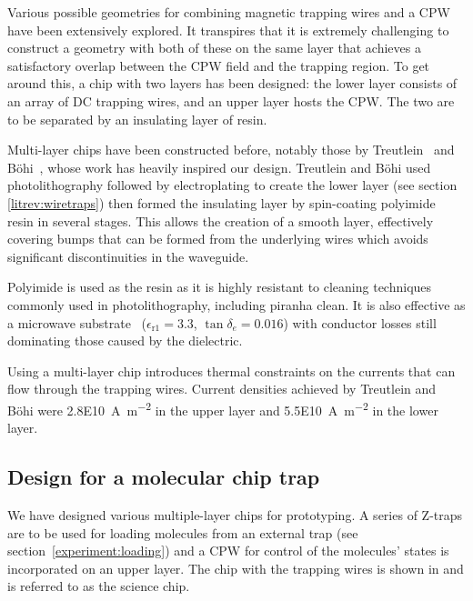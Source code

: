 Various possible geometries for combining magnetic trapping wires and a CPW have
been extensively explored. It transpires that it is extremely challenging to
construct a geometry with both of these on the same layer that achieves a
satisfactory overlap between the CPW field and the trapping region. To get
around this, a chip with two layers has been designed: the lower layer consists
of an array of DC trapping wires, and an upper layer hosts the CPW. The two are
to be separated by an insulating layer of resin.

Multi-layer chips have been constructed before, notably those by
Treutlein~\cite{Treutlein2008} and B\"ohi~\cite{rohuta}, whose work has heavily
inspired our design. Treutlein and B\"ohi used photolithography followed by
electroplating to create the lower layer (see section \ref{litrev:wiretraps})
then formed the insulating layer by spin-coating polyimide resin in several
stages. This allows the creation of a smooth layer, effectively covering bumps
that can be formed from the underlying wires which avoids significant
discontinuities in the waveguide.

Polyimide is used as the resin as it is highly resistant to cleaning techniques
commonly used in photolithography, including piranha clean.  It is also
effective as a microwave substrate~\cite{Simons2004}
($\epsilon_\mathrm{r1} = 3.3$, $\tan\delta_e = 0.016$) with conductor losses
still dominating those caused by the dielectric.

Using a multi-layer chip introduces thermal constraints on the currents that can
flow through the trapping wires. Current densities achieved by Treutlein and
B\"ohi were \SI{2.8E10}{\ampere\per\metre\squared} in the upper layer and
\SI{5.5E10}{\ampere\per\metre\squared} in the lower layer.

\subsection{Design for a molecular chip trap}

We have designed various multiple-layer chips for prototyping. A series of
Z-traps are to be used for loading molecules from an external trap (see
section~\ref{experiment:loading}) and a CPW for control of the molecules' states
is incorporated on an upper layer. The chip with the trapping wires is shown in
 and is referred to as the science chip.

